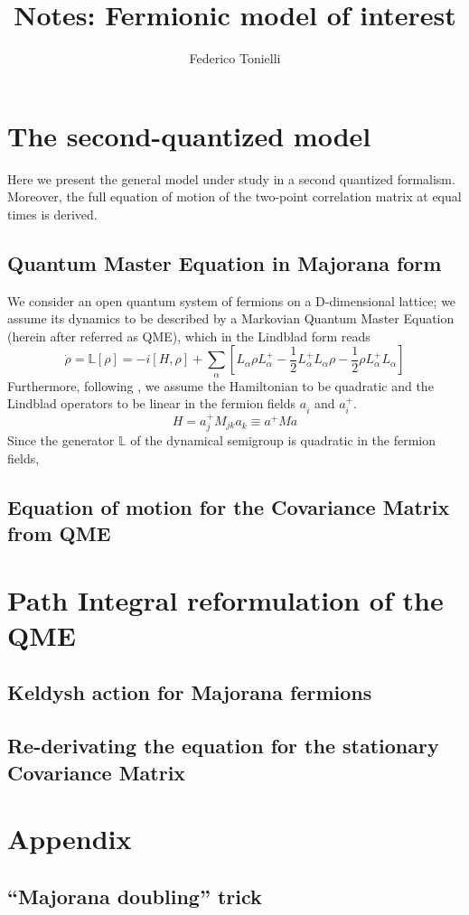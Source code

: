 \documentclass[a4paper,11pt]{amsart}
\title{Notes: Fermionic model of interest}
\author{Federico Tonielli}
\newcommand\blankpage{%
    \null
    \thispagestyle{empty}%
    \addtocounter{page}{-1}%
    \newpage}
\newcommand{\ro}{\rho}
\begin{document}
 \maketitle
 
 \tableofcontents
 \blankpage
 
 \section{The second-quantized model}
 Here we present the general model under study in a second quantized formalism.  Moreover, the full equation of motion of the two-point correlation matrix at equal times is derived.
 
  \subsection{Quantum Master Equation in Majorana form}
  We consider an open quantum system of fermions on a D-dimensional lattice; we assume its dynamics to be described by a Markovian Quantum Master Equation (herein after referred as QME), which in the Lindblad form reads
  \[\dot{\ro}=\mathbb{L}[\ro]=-i\left[H,\ro\right]+\sum_{\alpha}\left[L_{\alpha}^{ }\ro L_{\alpha}^+ - \frac{1}{2}L_{\alpha}^+L_{\alpha}^{ }\ro - \frac{1}{2}\ro L_{\alpha}^+L_{\alpha}^{ }\right]  \]
  Furthermore, following \cite{Eisert2010}, we assume the Hamiltonian to be quadratic and the Lindblad operators to be linear in the fermion fields $a_i^{ }$ and $a_i^+$. 
  \[ H = a_j^+M_{jk}a_k^{ } \equiv a^+Ma \]
  Since the generator $\mathbb{L}$ of the dynamical semigroup is quadratic in the fermion fields,  
  
  \subsection{Equation of motion for the Covariance Matrix from QME}
 \section{Path Integral reformulation of the QME}
  \subsection{Keldysh action for Majorana fermions}
  \subsection{Re-derivating the equation for the stationary Covariance Matrix}

  \appendix
  \section*{Appendix}
    \renewcommand{\thesection}{A}
    \subsection{``Majorana doubling'' trick}
   
   
{}
  
\end{document}
